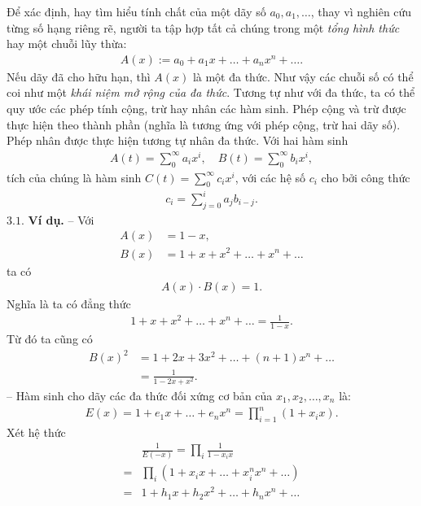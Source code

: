 \begin{multicols}{2}
	Để xác định, hay tìm hiểu tính chất của một dãy số $a_0,a_1,\ldots$, thay vì nghiên cứu từng số hạng riêng rẽ, người ta tập hợp tất cả chúng trong một { \em tổng hình thức} hay một chuỗi lũy thừa:
	\begin{align*}
		A(x):=a_0+a_1 x+\ldots+ a_nx^n+\ldots.
	\end{align*}
	Nếu dãy đã cho hữu hạn, thì $A(x)$ là một đa thức. Như vậy các chuỗi số có thể coi như một \textit{ khái niệm mở rộng của đa thức}.
	\vskip 0.1cm
	Tương tự như với đa thức, ta có thể quy ước các phép tính cộng, trừ hay nhân các hàm sinh.   
	\vskip 0.1cm
	Phép cộng và trừ được thực hiện theo thành phần (nghĩa là tương ứng với phép cộng, trừ hai dãy số).
	\vskip 0.1cm
	Phép nhân được thực hiện tương tự nhân đa thức. Với hai hàm sinh
	\begin{align*}
		A(t)=\sum_0^\infty a_ix^i,\quad B(t)=\sum_0^\infty b_i x^i,
	\end{align*}
	tích của chúng là hàm sinh $C(t)=\sum_0^\infty c_ix^i$, với các hệ số $c_i$ cho bởi công thức
	\begin{align*}
		c_i=\sum_{j=0}^i a_jb_{i-j}.
	\end{align*}
	$\pmb{3.1.}$ \textbf{\color{hoccungpi}Ví dụ.}
	\vskip 0.1cm
	-- Với
	\begin{align*}
		A(x)&=1-x,\\
		B(x)&=1+x+x^2+\ldots+x^n+\ldots
	\end{align*}
	ta có 
	\begin{align*}
		A(x)\cdot B(x)=1.
	\end{align*}
	Nghĩa là ta có đẳng thức
	\begin{align*}
		1+x+x^2+\ldots+x^n+\ldots=\frac 1{1-x}.
	\end{align*}
	Từ đó ta cũng có
	\begin{align*}
		B(x)^2&=1+2x+3x^2+\ldots+(n+1)x^n+\ldots\\
		&=\frac1{1-2x+x^2}.
	\end{align*}
	-- Hàm sinh cho dãy  các đa thức đối xứng cơ bản của $x_1,x_2,\ldots,x_n$ là: 
	\begin{align*}
		E(x)=1+e_1x+\ldots +e_nx^n=\prod_{i=1}^n (1+x_ix).
	\end{align*}   
	Xét hệ thức
	\begin{align*}
		&\frac 1{E(-x)}=\prod_i \frac 1{1-x_ix}\\
		=&\prod_i (1+x_i x+\ldots+x_i^nx^n+\ldots)\nonumber \\
		=& 1+h_1x+h_2x^2+\ldots+h_nx^n+\ldots  \tag{$7$}
	\end{align*} 

\end{multicols}
